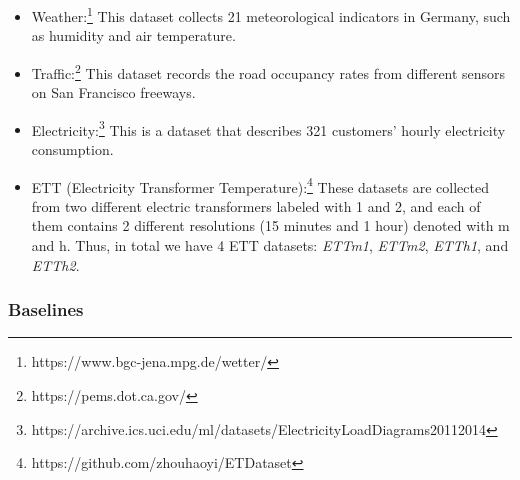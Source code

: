 \documentclass{article} \usepackage{iclr2024_conference,times}
\begin{document}
\begin{itemize}
\item {Weather:}\footnote{https://www.bgc-jena.mpg.de/wetter/} This dataset collects 21 meteorological indicators in Germany, such as humidity and air temperature. 
\item{Traffic:}\footnote{https://pems.dot.ca.gov/} This dataset records the road occupancy rates from different sensors on San Francisco freeways. \item{Electricity:}\footnote{https://archive.ics.uci.edu/ml/datasets/ElectricityLoadDiagrams20112014} This is a dataset that describes 321 customers' hourly electricity consumption.
\item{ETT (Electricity Transformer Temperature):}\footnote{https://github.com/zhouhaoyi/ETDataset} These datasets are collected from two different electric transformers labeled with 1 and 2, and each of them contains 2 different resolutions (15 minutes and 1 hour) denoted with m and h. Thus, in total we have 4 ETT datasets: \textit{ETTm1}, \textit{ETTm2}, \textit{ETTh1}, and \textit{ETTh2}. 
\end{itemize}








\subsubsection{Baselines}
\label{append::baselines}
\end{document}
